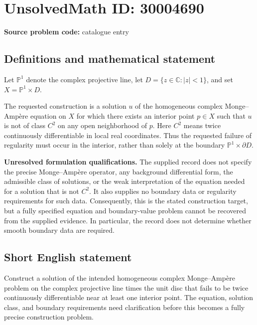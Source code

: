 \documentclass[11pt]{article}
\newcommand{\C}{\mathbb{C}}
\begin{document}
\section*{UnsolvedMath ID: 30004690}
\textbf{Source problem code:} catalogue entry
\subsection{Definitions and mathematical statement}
Let \(\mathbb{P}^{1}\) denote the complex projective line, let \(D=\{z\in\C:|z|<1\}\), and set \(X=\mathbb{P}^{1}\times D\).

The requested construction is a solution \(u\) of the homogeneous complex Monge--Amp\`ere equation on \(X\) for which there exists an interior point \(p\in X\) such that \(u\) is not of class \(C^{2}\) on any open neighborhood of \(p\). Here \(C^{2}\) means twice continuously differentiable in local real coordinates. Thus the requested failure of regularity must occur in the interior, rather than solely at the boundary \(\mathbb{P}^{1}\times\partial D\).

\textbf{Unresolved formulation qualifications.} The supplied record does not specify the precise Monge--Amp\`ere operator, any background differential form, the admissible class of solutions, or the weak interpretation of the equation needed for a solution that is not \(C^{2}\). It also supplies no boundary data or regularity requirements for such data. Consequently, this is the stated construction target, but a fully specified equation and boundary-value problem cannot be recovered from the supplied evidence. In particular, the record does not determine whether smooth boundary data are required.
\subsection{Short English statement}
Construct a solution of the intended homogeneous complex Monge--Amp\`ere problem on the complex projective line times the unit disc that fails to be twice continuously differentiable near at least one interior point. The equation, solution class, and boundary requirements need clarification before this becomes a fully precise construction problem.
\end{document}

